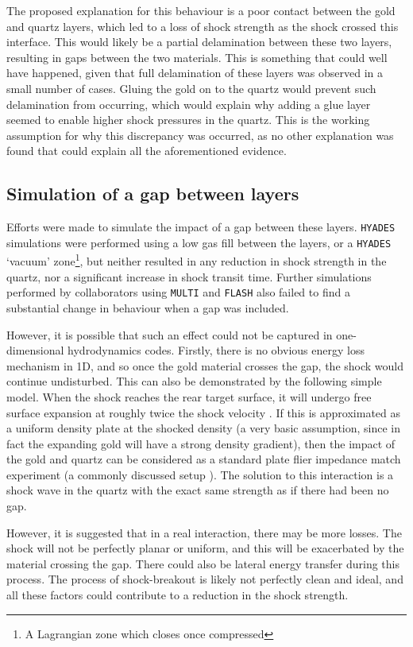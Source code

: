 The proposed explanation for this behaviour is a poor contact between the gold and quartz layers, which led to a loss of shock strength as the shock crossed this interface. This would likely be a partial delamination between these two layers, resulting in gaps between the two materials. This is something that could well have happened, given that full delamination of these layers was observed in a small number of cases. Gluing the gold on to the quartz would prevent such delamination from occurring, which would explain why adding a glue layer seemed to enable higher shock pressures in the quartz. This is the working assumption for why this discrepancy was occurred, as no other explanation was found that could explain all the aforementioned evidence.


\subsection{Simulation of a gap between layers}

Efforts were made to simulate the impact of a gap between these layers. \texttt{HYADES} simulations were performed using a low gas fill between the layers, or a \texttt{HYADES} `vacuum' zone\footnote{A Lagrangian zone which closes once compressed}, but neither resulted in any reduction in shock strength in the quartz, nor a significant increase in shock transit time. Further simulations performed by collaborators using \texttt{MULTI} and \texttt{FLASH} also failed to find a substantial change in behaviour when a gap was included.

However, it is possible that such an effect could not be captured in one-dimensional hydrodynamics codes. Firstly, there is no obvious energy loss mechanism in 1D, and so once the gold material crosses the gap, the shock would continue undisturbed. This can also be demonstrated by the following simple model. When the shock reaches the rear target surface, it will undergo free surface expansion at roughly twice the shock velocity \cite{Forbes2012}. If this is approximated as a uniform density plate at the shocked density (a very basic assumption, since in fact the expanding gold will have a strong density gradient), then the impact of the gold and quartz can be considered as a standard plate flier impedance match experiment (a commonly discussed setup \cite{Forbes2012}). The solution to this interaction is a shock wave in the quartz with the exact same strength as if there had been no gap.

However, it is suggested that in a real interaction, there may be more losses. The shock will not be perfectly planar or uniform, and this will be exacerbated by the material crossing the gap. There could also be lateral energy transfer during this process. The process of shock-breakout is likely not perfectly clean and ideal, and all these factors could contribute to a reduction in the shock strength.

